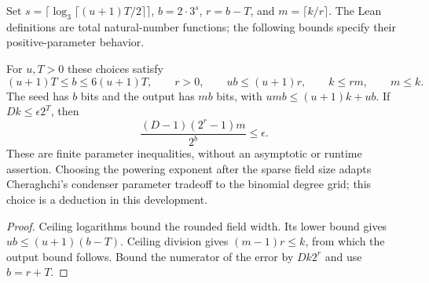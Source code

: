 \begin{definition}
  \label{def:lowerbounds-algebraic-sparse-condenser-parameters}
  \leanok
  Set $s=\lceil\log_3\lceil (u+1)T/2\rceil\rceil$,
  $b=2\cdot3^s$, $r=b-T$, and $m=\lceil k/r\rceil$.
  The Lean definitions are total natural-number functions; the
  following bounds specify their positive-parameter behavior.
\end{definition}

\begin{theorem}
  \label{thm:lowerbounds-algebraic-sparse-condenser-parameters}
  \leanok
  For $u,T>0$ these choices satisfy
  \[
    (u+1)T\le b\le6(u+1)T,\qquad r>0,\qquad
    ub\le(u+1)r,\qquad k\le rm,\qquad m\le k.
  \]
  The seed has $b$ bits and the output has $mb$ bits, with
  $umb\le(u+1)k+ub$. If $Dk\le\epsilon2^T$, then
  \[
    \frac{(D-1)(2^r-1)m}{2^b}\le\epsilon.
  \]
  These are finite parameter inequalities, without an asymptotic or
  runtime assertion. Choosing the powering exponent after the sparse
  field size adapts Cheraghchi's condenser parameter tradeoff to the
  binomial degree grid; this choice is a deduction in this development.
\end{theorem}
\begin{proof}
  \leanok
  Ceiling logarithms bound the rounded field width. Its lower bound
  gives $ub\le(u+1)(b-T)$. Ceiling division gives $(m-1)r\le k$,
  from which the output bound follows. Bound the numerator of the
  error by $Dk2^r$ and use $b=r+T$.
\end{proof}

